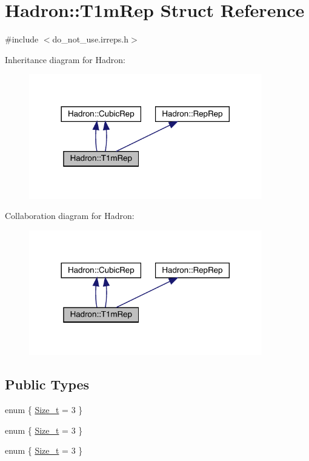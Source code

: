 \hypertarget{structHadron_1_1T1mRep}{}\section{Hadron\+:\+:T1m\+Rep Struct Reference}
\label{structHadron_1_1T1mRep}


{\ttfamily \#include $<$do\+\_\+not\+\_\+use.\+irreps.\+h$>$}



Inheritance diagram for Hadron\+:\nopagebreak
\begin{figure}[H]
\begin{center}
\leavevmode
\includegraphics[width=288pt]{d7/d39/structHadron_1_1T1mRep__inherit__graph}
\end{center}
\end{figure}


Collaboration diagram for Hadron\+:\nopagebreak
\begin{figure}[H]
\begin{center}
\leavevmode
\includegraphics[width=288pt]{d4/d67/structHadron_1_1T1mRep__coll__graph}
\end{center}
\end{figure}
\subsection*{Public Types}
\begin{DoxyCompactItemize}
\item 
enum \{ \mbox{\hyperlink{structHadron_1_1T1mRep_a6344153f7b0f23e2946649b06b139db2a4f817982fd5f82d5f1e1d9126415dbc2}{Size\+\_\+t}} = 3
 \}
\item 
enum \{ \mbox{\hyperlink{structHadron_1_1T1mRep_a6344153f7b0f23e2946649b06b139db2a4f817982fd5f82d5f1e1d9126415dbc2}{Size\+\_\+t}} = 3
 \}
\item 
enum \{ \mbox{\hyperlink{structHadron_1_1T1mRep_a6344153f7b0f23e2946649b06b139db2a4f817982fd5f82d5f1e1d9126415dbc2}{Size\+\_\+t}} = 3
 \}
\end{DoxyCompactItemize}
